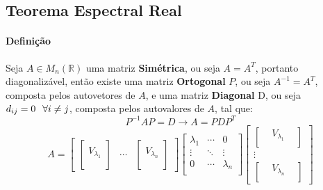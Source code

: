 \documentclass{article}
\begin{document}
        \subsection{Teorema Espectral Real}
            \paragraph{Definição}Seja $A\in M_{n}(\mathbb{R})$ uma matriz \textbf{Simétrica}, ou seja $A = A^{T}$, portanto diagonalizável, então existe uma matriz \textbf{Ortogonal} $P$, ou seja $A^{-1} = A^{T}$, composta pelos autovetores de $A$, e uma matriz \textbf{Diagonal} D, ou seja $d_{ij} = 0 \hspace{2.5mm} \forall i\neq j$, composta pelos autovalores de $A$, tal que:
                \[P^{-1} A P = D \rightarrow A = P D P^{T}\]
                \[
                    \boxed{
                        A =
                        \begin{bmatrix}
                            \begin{bmatrix}
                                \\ V_{\lambda_{1}} \\ \\
                            \end{bmatrix} &
                            \cdots &
                            \begin{bmatrix}
                                \\ V_{\lambda_{n}} \\ \\
                            \end{bmatrix}
                        \end{bmatrix} 
                        \begin{bmatrix}
                            \lambda_{1} & \cdots & 0\\
                            \vdots      & \ddots & \vdots\\
                            0           & \cdots & \lambda_{n}\\
                        \end{bmatrix}
                        \begin{bmatrix}
                            \begin{bmatrix}
                                & V_{\lambda_{1}} & \\
                            \end{bmatrix}\\
                            \vdots\\
                            \begin{bmatrix}
                                & V_{\lambda_{n}} & \\
                            \end{bmatrix}
                        \end{bmatrix}
                    }
                \]
\newpage
\end{document}
